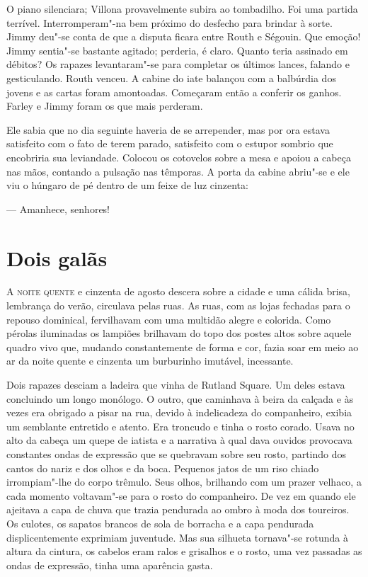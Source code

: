 O piano silenciara; Villona provavelmente subira ao tombadilho.  Foi uma
partida terrível.  Interromperam"-na bem próximo do desfecho para brindar à
sorte.  Jimmy deu"-se conta de que a disputa ficara entre Routh e Ségouin.  Que
emoção!  Jimmy sentia"-se bastante agitado; perderia, é claro.  Quanto teria
assinado em débitos?  Os rapazes levantaram"-se para completar os últimos
lances, falando e gesticulando.  Routh venceu.  A cabine do iate balançou com a
balbúrdia dos jovens e as cartas foram amontoadas.  Começaram então a conferir
os ganhos.  Farley e Jimmy foram os que mais perderam.

Ele sabia que no dia seguinte haveria de se arrepender, mas por ora estava
satisfeito com o fato de terem parado, satisfeito com o estupor sombrio que
encobriria sua leviandade.  Colocou os cotovelos sobre a mesa e apoiou a cabeça
nas mãos, contando a pulsação nas têmporas.  A porta da cabine abriu"-se e ele
viu o húngaro de pé dentro de um feixe de luz cinzenta:

--- Amanhece, senhores!


\chapter{Dois galãs}

\textsc{A noite quente} e cinzenta de agosto descera sobre a cidade e uma
cálida brisa, lembrança do verão, circulava pelas ruas.  As ruas, com as lojas
fechadas para o repouso dominical, fervilhavam com uma multidão alegre e
colorida.  Como pérolas iluminadas os lampiões brilhavam do topo dos postes
altos sobre aquele quadro vivo que, mudando constantemente de forma e cor,
fazia soar em meio ao ar da noite quente e cinzenta um burburinho imutável,
incessante.

Dois rapazes desciam a ladeira que vinha de Rutland Square.  Um deles estava
concluindo um longo monólogo.  O outro, que caminhava à beira da calçada e às
vezes era obrigado a pisar na rua, devido à indelicadeza do companheiro, exibia
um semblante entretido e atento.  Era troncudo e tinha o rosto corado.  Usava
no alto da cabeça um quepe de iatista e a narrativa à qual dava ouvidos
provocava constantes ondas de expressão que se quebravam sobre seu rosto,
partindo dos cantos do nariz e dos olhos e da boca.  Pequenos jatos de um riso
chiado irrompiam"-lhe do corpo trêmulo.  Seus olhos, brilhando com um prazer
velhaco, a cada momento voltavam"-se para o rosto do companheiro.  De vez em
quando ele ajeitava a capa de chuva que trazia pendurada ao ombro à moda dos
toureiros.  Os culotes, os sapatos brancos de sola de borracha e a capa
pendurada displicentemente exprimiam juventude.  Mas sua silhueta tornava"-se
rotunda à altura da cintura, os cabelos eram ralos e grisalhos e o rosto, uma
vez passadas as ondas de expressão, tinha uma aparência gasta.

